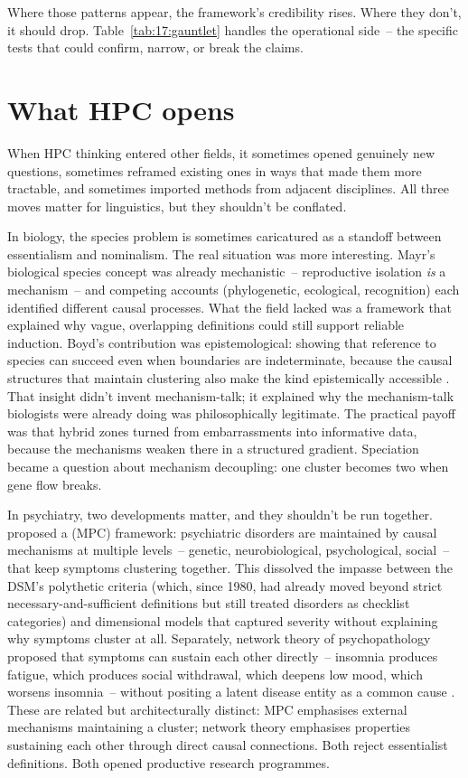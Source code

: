 Where those patterns appear, the framework's credibility rises. Where they don't, it should drop. Table~\ref{tab:17:gauntlet} handles the operational side~-- the specific tests that could confirm, narrow, or break the claims.

\section{What HPC opens}
\label{sec:17:what-hpc-opens}

When HPC thinking entered other fields, it sometimes opened genuinely new questions, sometimes reframed existing ones in ways that made them more tractable, and sometimes imported methods from adjacent disciplines. All three moves matter for linguistics, but they shouldn't be conflated.

In biology, the species problem is sometimes caricatured as a standoff between essentialism and nominalism. The real situation was more interesting. Mayr's biological species concept was already mechanistic~-- reproductive isolation \emph{is} a mechanism~-- and competing accounts (phylogenetic, ecological, recognition) each identified different causal processes. What the field lacked was a framework that explained why vague, overlapping definitions could still support reliable induction. Boyd's contribution was epistemological: showing that reference to species can succeed even when boundaries are indeterminate, because the causal structures that maintain clustering also make the kind epistemically accessible \citep{boyd1999}. That insight didn't invent mechanism-talk; it explained why the mechanism-talk biologists were already doing was philosophically legitimate. The practical payoff was that hybrid zones turned from embarrassments into informative data, because the mechanisms weaken there in a structured gradient. Speciation became a question about mechanism decoupling: one cluster becomes two when gene flow breaks.

In psychiatry, two developments matter, and they shouldn't be run together. \textcite{kendler2011} proposed a  (MPC) framework: psychiatric disorders are maintained by causal mechanisms at multiple levels~-- genetic, neurobiological, psychological, social~-- that keep symptoms clustering together. This dissolved the impasse between the DSM's polythetic criteria (which, since 1980, had already moved beyond strict necessary-and-sufficient definitions but still treated disorders as checklist categories) and dimensional models that captured severity without explaining why symptoms cluster at all. Separately, network theory of psychopathology proposed that symptoms can sustain each other directly~-- insomnia produces fatigue, which produces social withdrawal, which deepens low mood, which worsens insomnia~-- without positing a latent disease entity as a common cause \citep{borsboom2017}. These are related but architecturally distinct: MPC emphasises external mechanisms maintaining a cluster; network theory emphasises properties sustaining each other through direct causal connections. Both reject essentialist definitions. Both opened productive research programmes.

